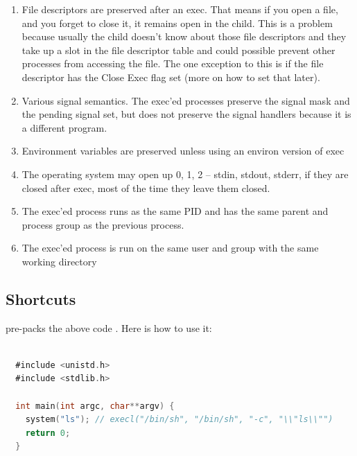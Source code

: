 \begin{itemize}
\begin{enumerate}
\item File descriptors are preserved after an exec. That means if you open a file, and you forget to close it, it remains open in the child.
  This is a problem because usually the child doesn't know about those file descriptors and they take up a slot in the file descriptor table and could possible prevent other processes from accessing the file.
  The one exception to this is if the file descriptor has the Close Exec flag set (more on how to set that later).
\item Various signal semantics. The exec'ed processes preserve the signal mask and the pending signal set, but does not preserve the signal handlers because it is a different program.
\item Environment variables are preserved unless using an environ version of exec
  \item The operating system may open up 0, 1, 2 -- stdin, stdout, stderr, if they are closed after exec, most of the time they leave them closed.
  \item The exec'ed process runs as the same PID and has the same parent and process group as the previous process.
    \item The exec'ed process is run on the same user and group with the same working directory
\end{enumerate}

\subsection{Shortcuts}

 pre-packs the above code \cite[P. 371]{jones2010wg14}. Here is how to use it:

\begin{lstlisting}[language=C]

  #include <unistd.h>
  #include <stdlib.h>

  int main(int argc, char**argv) {
    system("ls"); // execl("/bin/sh", "/bin/sh", "-c", "\\"ls\\"")
    return 0;
  }
\end{lstlisting}


\end{itemize}
